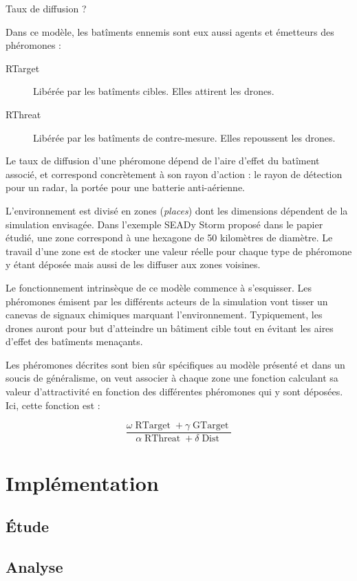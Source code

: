 \documentclass[12pt]{article}
\begin{document}
Taux de diffusion ?

Dans ce modèle, les batîments ennemis sont eux aussi agents et émetteurs des phéromones :

\begin{description}
  \item[RTarget]{Libérée par les batîments cibles. Elles attirent les drones.}
  \item[RThreat]{Libérée par les batîments de contre-mesure. Elles repoussent les drones.}
\end{description}

Le taux de diffusion d'une phéromone dépend de l'aire d'effet du batîment associé, et correspond concrètement à son rayon d'action :
le rayon de détection pour un radar, la portée pour une batterie anti-aérienne.

L'environnement est divisé en zones (\textit{places}) dont les dimensions dépendent de la simulation envisagée. 
Dans l'exemple SEADy Storm proposé dans le papier étudié, une zone correspond à une hexagone de 50 kilomètres de diamètre.
Le travail d'une zone est de stocker une valeur réelle pour chaque type de phéromone y étant déposée mais aussi de les diffuser aux zones
voisines.

Le fonctionnement intrinsèque de ce modèle commence à s'esquisser. Les phéromones émisent par les
différents acteurs de la simulation vont tisser un canevas de signaux chimiques marquant l'environnement.
Typiquement, les drones auront pour but d'atteindre un bâtiment cible tout en évitant les aires d'effet des
batîments menaçants.

Les phéromones décrites sont bien sûr spécifiques au modèle présenté et dans un soucis
de généralisme, on veut associer à chaque zone une fonction calculant sa valeur d'attractivité
en fonction des différentes phéromones qui y sont déposées. Ici, cette fonction est :

$$
\frac{\omega \operatorname{RTarget} + \gamma \operatorname{GTarget}}{\alpha \operatorname{RThreat} + \delta \operatorname{Dist}}
$$


\section{Implémentation}

\subsection{\'Etude}

\subsection{Analyse}



\end{document}
